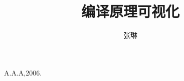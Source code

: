 \documentclass{article}
\title{编译原理可视化}
\author{张琳}
\begin{document}
\maketitle


\newpage
\tableofcontents
\newpage









\begin{thebibliography}{0}
A.A.A,2006.
\end{thebibliography}
\end{document}
